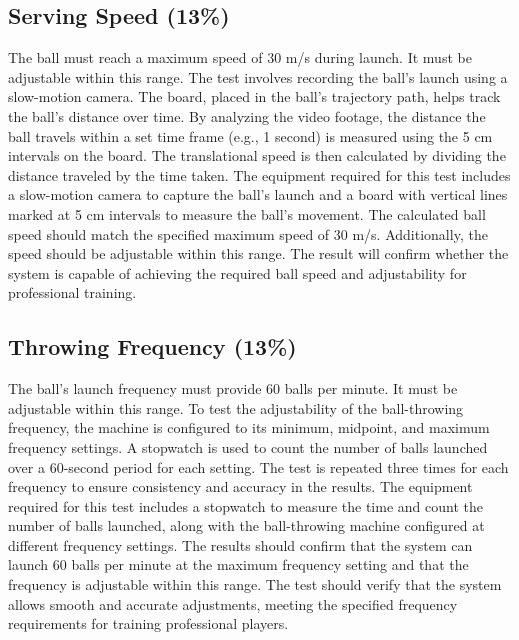 \documentclass[12pt]{article}
\begin{document}
\subsection{Serving Speed (13\%)}
The ball must reach a maximum speed of 30 m/s during launch. It must be adjustable within this range. The test involves recording the ball's launch using a slow-motion camera. The board, placed in the ball’s trajectory path, helps track the ball’s distance over time. By analyzing the video footage, the distance the ball travels within a set time frame (e.g., 1 second) is measured using the 5 cm intervals on the board. The translational speed is then calculated by dividing the distance traveled by the time taken. The equipment required for this test includes a slow-motion camera to capture the ball’s launch and a board with vertical lines marked at 5 cm intervals to measure the ball’s movement. The calculated ball speed should match the specified maximum speed of 30 m/s. Additionally, the speed should be adjustable within this range. The result will confirm whether the system is capable of achieving the required ball speed and adjustability for professional training.
\subsection{Throwing Frequency (13\%)}
The ball’s launch frequency must provide 60 balls per minute. It must be adjustable within this range. To test the adjustability of the ball-throwing frequency, the machine is configured to its minimum, midpoint, and maximum frequency settings. A stopwatch is used to count the number of balls launched over a 60-second period for each setting. The test is repeated three times for each frequency to ensure consistency and accuracy in the results. The equipment required for this test includes a stopwatch to measure the time and count the number of balls launched, along with the ball-throwing machine configured at different frequency settings. The results should confirm that the system can launch 60 balls per minute at the maximum frequency setting and that the frequency is adjustable within this range. The test should verify that the system allows smooth and accurate adjustments, meeting the specified frequency requirements for training professional players.
\end{document}
